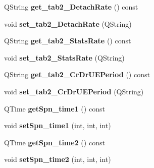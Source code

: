 \begin{DoxyCompactItemize}
\item 
Q\+String {\bfseries get\+\_\+tab2\+\_\+\+Detach\+Rate} () const \hypertarget{class_time_data_adf716fd8a2ef1739427b32c083c87a33}{}\label{class_time_data_adf716fd8a2ef1739427b32c083c87a33}

\item 
void {\bfseries set\+\_\+tab2\+\_\+\+Detach\+Rate} (Q\+String)\hypertarget{class_time_data_a99e217270b06df49e85bf3ca0e07a10f}{}\label{class_time_data_a99e217270b06df49e85bf3ca0e07a10f}

\item 
Q\+String {\bfseries get\+\_\+tab2\+\_\+\+Stats\+Rate} () const \hypertarget{class_time_data_a171d549fc330f541a847363a8683789e}{}\label{class_time_data_a171d549fc330f541a847363a8683789e}

\item 
void {\bfseries set\+\_\+tab2\+\_\+\+Stats\+Rate} (Q\+String)\hypertarget{class_time_data_a16249294ea29bbf45e2a3895355e33d1}{}\label{class_time_data_a16249294ea29bbf45e2a3895355e33d1}

\item 
Q\+String {\bfseries get\+\_\+tab2\+\_\+\+Cr\+Dr\+U\+E\+Period} () const \hypertarget{class_time_data_a0c780d45dd12417a51ce75002aca25ff}{}\label{class_time_data_a0c780d45dd12417a51ce75002aca25ff}

\item 
void {\bfseries set\+\_\+tab2\+\_\+\+Cr\+Dr\+U\+E\+Period} (Q\+String)\hypertarget{class_time_data_aaa964b080f1d9d0965ffc38e5108cd3f}{}\label{class_time_data_aaa964b080f1d9d0965ffc38e5108cd3f}

\item 
Q\+Time {\bfseries get\+Spn\+\_\+time1} () const \hypertarget{class_time_data_affb3f2fb014c53ac2d6efab75dfb7a12}{}\label{class_time_data_affb3f2fb014c53ac2d6efab75dfb7a12}

\item 
void {\bfseries set\+Spn\+\_\+time1} (int, int, int)\hypertarget{class_time_data_ab95e7d75970b88c96bc64855f6942f83}{}\label{class_time_data_ab95e7d75970b88c96bc64855f6942f83}

\item 
Q\+Time {\bfseries get\+Spn\+\_\+time2} () const \hypertarget{class_time_data_a3c23616b311d1253f7f102b6d77bf989}{}\label{class_time_data_a3c23616b311d1253f7f102b6d77bf989}

\item 
void {\bfseries set\+Spn\+\_\+time2} (int, int, int)\hypertarget{class_time_data_aaaf5ba6d703c805fb24dc9e6b15763cc}{}\label{class_time_data_aaaf5ba6d703c805fb24dc9e6b15763cc}


\end{DoxyCompactItemize}
